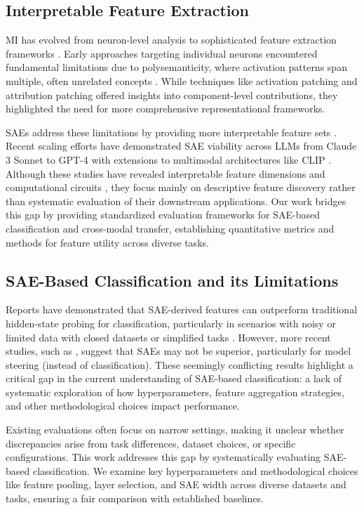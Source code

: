 \subsection{Interpretable Feature Extraction}

MI has evolved from neuron-level analysis to sophisticated feature extraction frameworks \cite{olah2020zoom, rajamanoharan2024improving}. Early approaches targeting individual neurons encountered fundamental limitations due to polysemanticity, where activation patterns span multiple, often unrelated concepts \cite{bolukbasi2021interpretability, elhage2022toy}. While techniques like activation patching \cite{meng2022locating} and attribution patching \cite{syed2023attribution} offered insights into component-level contributions, they highlighted the need for more comprehensive representational frameworks.

SAEs address these limitations by providing more interpretable feature sets \cite{bricken2023towards, cunningham2023scaling}. Recent scaling efforts have demonstrated SAE viability across LLMs from Claude 3 Sonnet \cite{templeton2024scaling} to GPT-4 \cite{gao2024scaling} with extensions to multimodal architectures like CLIP \cite{bhalla2024interpreting}. Although these studies have revealed interpretable feature dimensions and computational circuits \cite{marks2024sparse, zhao2024steeringknowledgeselectionbehaviours}, they focus mainly on descriptive feature discovery rather than systematic evaluation of their downstream applications. Our work bridges this gap by providing standardized evaluation frameworks for SAE-based classification and cross-modal transfer, establishing quantitative metrics and methods for feature utility across diverse tasks.

\subsection{SAE-Based Classification and its Limitations}
Reports have demonstrated that SAE-derived features can outperform traditional hidden-state probing for classification, particularly in scenarios with noisy or limited data with closed datasets \cite{anthropic2024features} or simplified tasks \cite{sae_probing}. However, more recent studies, such as \citet{wu2025axbenchsteeringllmssimple}, suggest that SAEs may not be superior, particularly for model steering (instead of classification). These seemingly conflicting results highlight a critical gap in the current understanding of SAE-based classification: a lack of systematic exploration of how hyperparameters, feature aggregation strategies, and other methodological choices impact performance. 

Existing evaluations often focus on narrow settings, making it unclear whether discrepancies arise from task differences, dataset choices, or specific configurations. This work addresses this gap by systematically evaluating SAE-based classification. We examine key hyperparameters and methodological choices like feature pooling, layer selection, and SAE width across diverse datasets and tasks, ensuring a fair comparison with established baselines.



